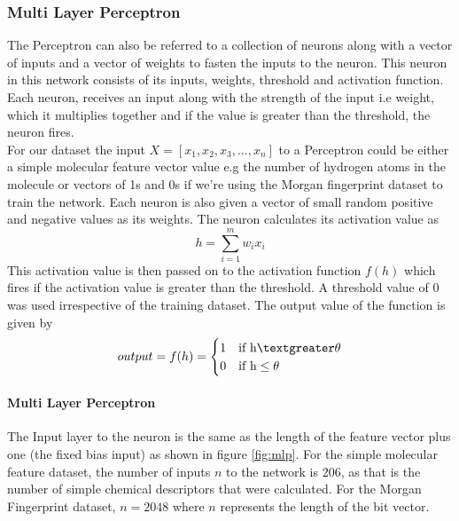 \documentclass[a4paper,12pt]{report}
\begin{document}
			\subsubsection{Multi Layer Perceptron}
			The Perceptron can also be referred to a collection of neurons along with a vector of inputs and a vector of weights to fasten the inputs to the neuron. This neuron in this network consists of its inputs, weights, threshold and activation function. Each neuron, receives an input along with the strength of the input i.e weight, which it multiplies together and if the value is greater than the threshold, the neuron fires. \\
			For our dataset the input $X = [x_1,x_2,x_3,...,x_n]$ to a Perceptron could be either a simple molecular feature vector value e.g the number of hydrogen atoms in the molecule or vectors of 1s and 0s if we're using the Morgan fingerprint dataset to train the network. Each neuron is also given a vector of small random positive and negative values as its weights. The neuron calculates its activation value as 
				\begin{equation}
				h = \sum_{i=1}^{m}w_ix_i
				\end{equation}
			This activation value is then passed on to the activation function $f(h)$ which fires if the activation value is greater than the threshold. A threshold value of 0 was used irrespective of the training dataset. The output value of the function is given by
				\begin{equation}
					output = f(h) = 
					\begin{cases}
					1 & \text{if h} \textgreater \theta \\
					0 & \text{if h} \le \theta
					\end{cases}
				\end{equation}
			\paragraph{Multi Layer Perceptron}
			The Input layer to the neuron is the same as the length of the feature vector plus one (the fixed bias input) as shown in figure \ref{fig:mlp}. For the simple molecular feature dataset, the number of inputs $n$ to the network is 206, as that is the number of simple chemical descriptors that were calculated. For the Morgan Fingerprint dataset, $n = 2048$ where $n$ represents the length of the bit vector. 
			
\end{document}
